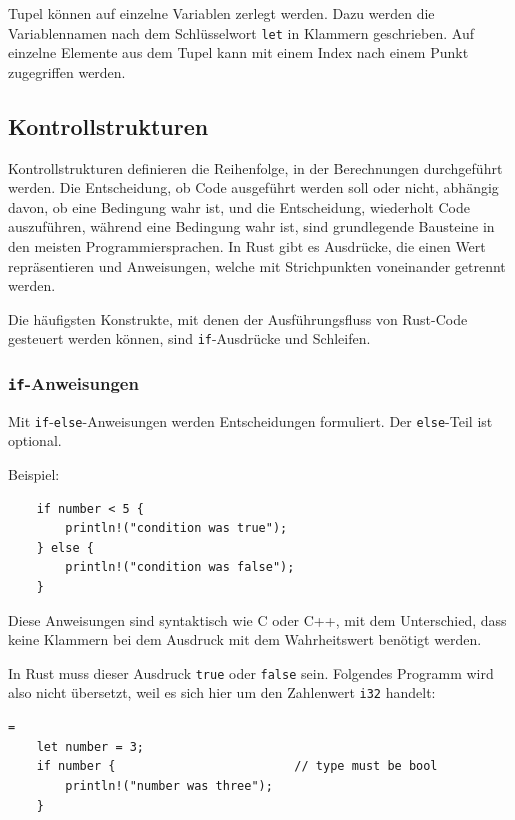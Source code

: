 Tupel können auf einzelne Variablen zerlegt werden. Dazu werden die Variablennamen nach dem Schlüsselwort \verb"let" in Klammern geschrieben. Auf einzelne Elemente aus dem Tupel kann mit einem Index nach einem Punkt zugegriffen werden.

\subsection{Kontrollstrukturen}

Kontrollstrukturen definieren die Reihenfolge, in der Berechnungen durchgeführt werden. Die Entscheidung, ob Code ausgeführt werden soll oder nicht, abhängig davon, ob eine Bedingung wahr ist, und die Entscheidung, wiederholt Code aus\-zu\-füh\-ren, während eine Bedingung wahr ist, sind grundlegende Bausteine in den meisten Programmiersprachen. In Rust gibt es Ausdrücke, die einen Wert repräsentieren und Anweisungen, welche mit Strichpunkten voneinander getrennt werden.

Die häufigsten Konstrukte, mit denen der Ausführungsfluss von Rust-Code gesteuert werden können, sind \verb"if"-Ausdrücke und Schleifen.

\subsubsection{\texttt{if}-Anweisungen}

Mit \verb"if"-\verb"else"-Anweisungen werden Entscheidungen formuliert. Der \verb"else"-Teil ist optional.

Beispiel:

\begin{lstlisting}
    if number < 5 {
        println!("condition was true");
    } else {
        println!("condition was false");
    }
\end{lstlisting}

Diese Anweisungen sind syntaktisch wie C oder C++, mit dem Unterschied, dass keine Klammern bei dem Ausdruck mit dem Wahrheitswert benötigt werden.

In Rust muss dieser Ausdruck \verb"true" oder \verb"false" sein. Folgendes Programm wird also nicht übersetzt, weil es sich hier um den Zahlenwert \verb"i32" handelt:

\begin{lstlisting}=
    let number = 3;
    if number {                         // type must be bool
        println!("number was three");
    }
\end{lstlisting}

